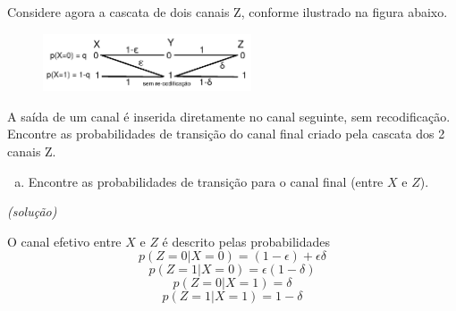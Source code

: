\begin{frame}[allowframebreaks]
\begin{exercise}[Canal Z]



  \end{exercise}


  \framebreak

  \begin{exercise}
  Considere agora a cascata de dois canais Z, conforme ilustrado na figura abaixo.
  \begin{figure}[h!]
  \centering
  \includegraphics[width=0.55\textwidth]{images/canalzc.pdf}
  \label{fig:canalzc}
  \end{figure}
  A saída de um canal é inserida diretamente no canal seguinte, sem recodificação.
  Encontre as probabilidades de transição do canal final criado pela cascata dos
  2 canais Z.
 
  \exercisebreak 
  \begin{enumerate}[a)]
  \item Encontre as probabilidades de transição para o canal final (entre $X$ e $Z$).
  \end{enumerate}
  \textit{(solução)}
  
  O canal efetivo entre $X$ e $Z$ é descrito pelas probabilidades
  \begin{equation}
  p(Z=0|X=0) = (1-\epsilon) + \epsilon \delta
  \end{equation}
  \begin{equation}
  p(Z=1|X=0) = \epsilon (1-\delta)
  \end{equation}
  \begin{equation}
  p(Z=0|X=1) = \delta
  \end{equation}
  \begin{equation}
  p(Z=1|X=1) = 1-\delta
  \end{equation}


\end{exercise}
\end{frame}
